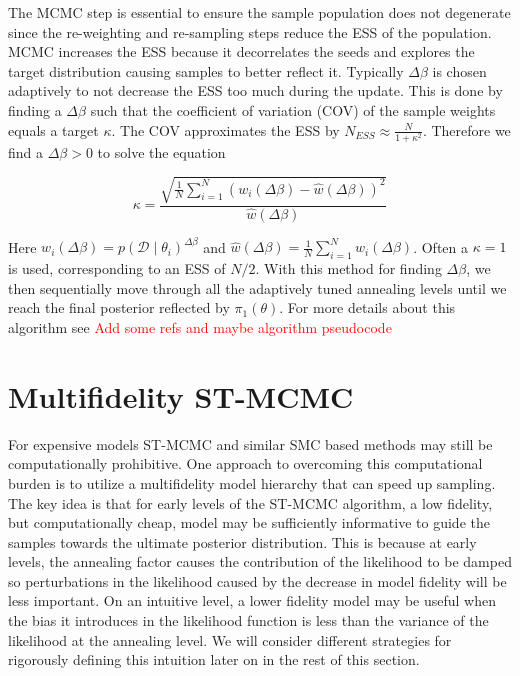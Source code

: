 \documentclass[1p]{article}
\begin{document}
The MCMC step is essential to ensure the sample population does not degenerate since the re-weighting and re-sampling steps reduce the ESS of the population. MCMC increases the ESS because it decorrelates the seeds and explores the target distribution causing samples to better reflect it. Typically $\Delta \beta$ is chosen adaptively to not decrease the ESS too much during the update. This is done by finding a $\Delta \beta$ such that the coefficient of variation (COV) of the sample weights equals a target $\kappa$. The COV approximates the ESS by $N_{ESS} \approx \frac{N}{1 + \kappa^2}$. Therefore we find a $\Delta \beta > 0$ to solve the equation

\begin{equation}
\kappa = \frac{\sqrt{\frac{1}{N} \sum_{i=1}^N \left ( w_i \left ( \Delta \beta \right ) - \hat{w}\left ( \Delta \beta \right ) \right)^2}}{\hat{w}\left ( \Delta \beta \right )}
\label{eq:betatune}
\end{equation}

Here $w_i\left ( \Delta \beta \right ) = p \left (\mathcal{D} \mid \theta_i \right )^{\Delta \beta}$ and $\hat{w}\left ( \Delta \beta \right ) = \frac{1}{N} \sum_{i=1}^N w_i\left ( \Delta \beta \right )$. Often a $\kappa = 1$ is used, corresponding to an ESS of $N/2$. With this method for finding $\Delta \beta$, we then sequentially move through all the adaptively tuned annealing levels until we reach the final posterior reflected by $\pi_1\left (\theta \right )$. For more details about this algorithm see \textcolor{red}{Add some refs and maybe algorithm pseudocode}

\section{Multifidelity ST-MCMC}

For expensive models ST-MCMC and similar SMC based methods may still be computationally prohibitive. One approach to overcoming this computational burden is to utilize a multifidelity model hierarchy that can speed up sampling. The key idea is that for early levels of the ST-MCMC algorithm, a low fidelity, but computationally cheap, model may be sufficiently informative to guide the samples towards the ultimate posterior distribution. This is because at early levels, the annealing factor causes the contribution of the likelihood to be damped so perturbations in the likelihood caused by the decrease in model fidelity will be less important. On an intuitive level, a lower fidelity model may be useful when the bias it introduces in the likelihood function is less than the variance of the likelihood at the annealing level. We will consider different strategies for rigorously defining this intuition later on in the rest of this section.
\end{document}
